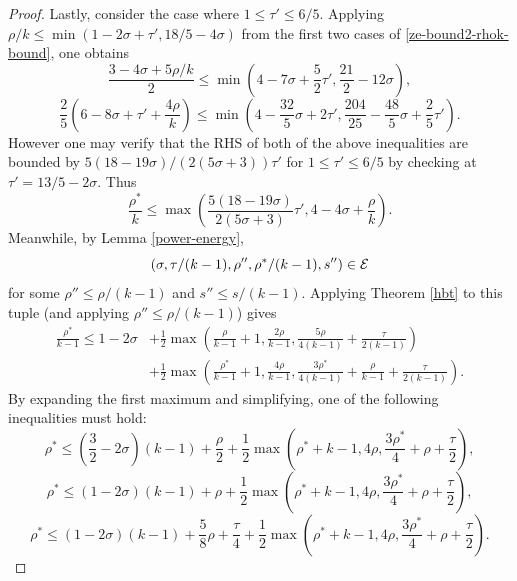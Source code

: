 \begin{proof}
Lastly, consider the case where $1 \le \tau' \le 6/5$. Applying $\rho/k \le \min(1 - 2\sigma + \tau', 18/5 - 4\sigma)$ from the first two cases of \eqref{ze-bound2-rhok-bound}, one obtains
\[
    \frac{3 - 4\sigma + 5\rho/k}{2} \le \min\left(4 - 7\sigma + \frac{5}{2}\tau', \frac{21}{2} - 12\sigma\right),
\]
\[
    \frac{2}{5}(6 - 8\sigma + \tau' + \frac{4\rho}{k}) \le \min\left(4 - \frac{32}{5}\sigma + 2\tau', \frac{204}{25} - \frac{48}{5}\sigma + \frac{2}{5}\tau'\right).
\]
However one may verify that the RHS of both of the above inequalities are bounded by $5(18 - 19\sigma)/(2(5\sigma + 3))\tau'$ for $1 \le \tau' \le 6/5$ by checking at $\tau' = 13/5 - 2\sigma$. Thus
\begin{equation}
    \label{ze-bound2-rhok-temp1}
    \frac{\rho^*}{k} \le \max\left(\frac{5(18 - 19\sigma)}{2(5\sigma + 3)}\tau', 4 - 4\sigma + \frac{\rho}{k}\right).
\end{equation}
Meanwhile, by Lemma \ref{power-energy},
\[
(\sigma, \tau/(k-1), \rho'', \rho^*/(k-1), s'')\in\mathcal{E}
\]
for some $\rho''\le\rho/(k-1)$ and $s''\le s/(k-1)$. Applying Theorem \ref{hbt} to this tuple (and applying $\rho''\le \rho/(k-1)$) gives
\begin{equation}\label{ze-bound2-rhostar-k1}
\begin{split}
\frac{\rho^*}{k - 1} \le 1-2\sigma &+ \frac{1}{2}\max(\frac{\rho}{k - 1}+1, \frac{2\rho}{k -1 }, \frac{5\rho}{4(k - 1)} + \frac{\tau}{2(k - 1)}) \\
&+ \frac{1}{2}\max(\frac{\rho^*}{k - 1}+1, \frac{4\rho}{k - 1}, \frac{3\rho^*}{4(k - 1)} +\frac{\rho}{k - 1}+\frac{\tau}{2(k-1)}).
\end{split}
\end{equation}
By expanding the first maximum and simplifying, one of the following inequalities must hold:
\begin{equation}\label{ze-bound2-rhostar-k1-case1}
    \rho^* \le (\frac{3}{2} - 2\sigma)(k - 1) + \frac{\rho}{2} + \frac{1}{2}\max(\rho^* + k - 1, 4\rho, \frac{3\rho^*}{4} + \rho + \frac{\tau}{2}),
\end{equation}
\begin{equation}\label{ze-bound2-rhostar-k1-case2}
\rho^* \le (1 - 2\sigma)(k - 1) + \rho + \frac{1}{2}\max(\rho^* + k - 1, 4\rho, \frac{3\rho^*}{4} + \rho + \frac{\tau}{2}),
\end{equation}
\begin{equation}\label{ze-bound2-rhostar-k1-case3}
\rho^* \le (1 - 2\sigma)(k - 1) + \frac{5}{8}\rho + \frac{\tau}{4} + \frac{1}{2}\max(\rho^* + k - 1, 4\rho, \frac{3\rho^*}{4} + \rho + \frac{\tau}{2}).

\end{equation}
\end{proof}
